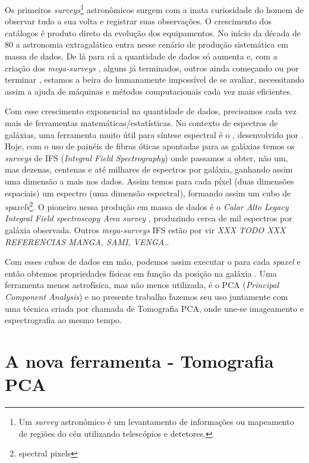 Os primeiros {\em surveys}\footnote{Um {\em survey} astronômico é um
levantamento de informações ou mapeamento de regiões do céu utilizando
telescópios e detetores.} astronômicos surgem com a inata curiosidade do homem
de observar tudo a sua volta e registrar suas observações. O crescimento
dos catálogos é produto direto da evolução dos equipamentos. No início da década de 80
\citep{Huchra1983} \citep{Huchra1988} \citep{DaCosta1988} a astronomia
extragalática entra nesse cenário de produção sistemática em massa de dados. De
lá para cá a quantidade de dados só aumenta e, com a criação dos
{\em mega-surveys} \citep[\SDSS; ][]{York2000} \citep[2dFGRS;][]{Colless1999}
\citep[2MASS;][]{Skrutskie2006}, alguns já terminados, outros ainda começando ou
por terminar \citep[LSST; ][]{Ivezic2008} \citep[J-PAS;][]{Benitez2009},
estamos a beira do humanamente impossível de se avaliar, necessitando assim a
ajuda de máquinas e métodos computacionais cada vez mais eficientes.

Com esse crescimento exponencial na quantidade de dados, precisamos cada vez
mais de ferramentas matemáticas/estatísticas. No contexto de espectros de galáxias,
uma ferramenta muito útil para síntese espectral é o \starlight, desenvolvido
por \citet{CidFernandes2005}. Hoje, com o uso de painéis de fibras óticas
apontadas para as galáxias temos os {\em surveys} de IFS ({\em Integral Field
Spectrography}) onde passamos a obter, não um, mas dezenas, centenas e até
milhares de espectros por galáxia, ganhando assim uma dimensão a mais nos dados.
Assim temos para cada píxel (duas dimensões espaciais) um espectro (uma dimensão
espectral), formando assim um cubo de {\em spaxels}\footnote{spectral pixels}.
O pioneiro nessa produção em massa de dados é o {\em Calar Alto Legacy Integral
Field spectroscopy Area survey} \citep[CALIFA; ][]{CALIFAPresent2012},
produzindo cerca de mil espectros por galáxia observada. Outros {\em
mega-surveys} IFS estão por vir {\em XXX TODO XXX REFERENCIAS MANGA, SAMI, VENGA.}. 

Com esses cubos de dados em mão, podemos assim executar o \starlight para
cada {\em spaxel} e então obtemos propriedades físicas em função da posição na
galáxia \citep{CidFernandes20131}. Uma ferramenta menos astrofísica, mas não
menos utilizada, é o PCA ({\em Principal Component Analysis}) e no presente
trabalho fazemos seu uso juntamente com uma técnica criada por
\citet{Steiner2009} chamada de Tomografia PCA, onde une-se imageamento e
espectrografia ao mesmo tempo.

\section{A nova ferramenta - Tomografia PCA}
\label{sec:Intro:TomoPCA}

